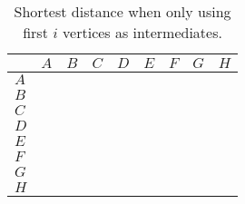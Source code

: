 \begin{table}[H]
    \centering
\begin{tabular}{|l|l|l|l|l|l|l|l|l|}
\hline
 & $A$ & $B$ & $C$ & $D$ & $E$ & $F$ & $G$ & $H$ \\ \hline
$A$ & & & & & & & & \\ \hline
$B$ & & & & & & & & \\ \hline
$C$ & & & & & & & & \\ \hline
$D$ & & & & & & & & \\ \hline
$E$ & & & & & & & & \\ \hline
$F$ & & & & & & & & \\ \hline
$G$ & & & & & & & & \\ \hline
$H$ & & & & & & & & \\ \hline
\end{tabular}
    \caption{Shortest distance when only using first $i$ vertices as intermediates.}
\end{table}
